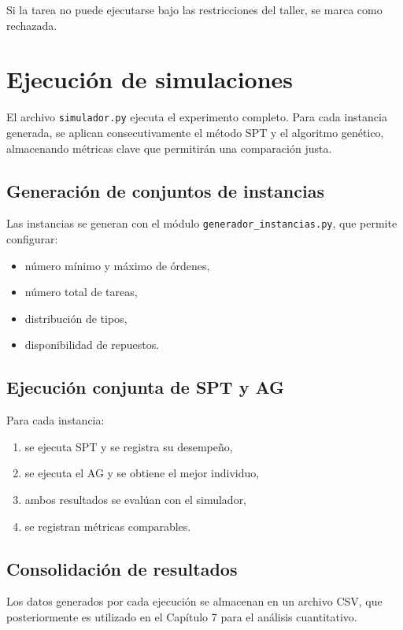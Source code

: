 Si la tarea no puede ejecutarse bajo las restricciones del taller, se marca como rechazada.

\section{Ejecución de simulaciones}

El archivo \texttt{simulador.py} ejecuta el experimento completo. Para cada instancia generada, se aplican consecutivamente el método SPT y el algoritmo genético, almacenando métricas clave que permitirán una comparación justa.

\subsection{Generación de conjuntos de instancias}

Las instancias se generan con el módulo \texttt{generador\_instancias.py}, que permite configurar:

\begin{itemize}
    \item número mínimo y máximo de órdenes,
    \item número total de tareas,
    \item distribución de tipos,
    \item disponibilidad de repuestos.
\end{itemize}

\subsection{Ejecución conjunta de SPT y AG}

Para cada instancia:

\begin{enumerate}
    \item se ejecuta SPT y se registra su desempeño,
    \item se ejecuta el AG y se obtiene el mejor individuo,
    \item ambos resultados se evalúan con el simulador,
    \item se registran métricas comparables.
\end{enumerate}

\subsection{Consolidación de resultados}

Los datos generados por cada ejecución se almacenan en un archivo CSV, que posteriormente es utilizado en el Capítulo 7 para el análisis cuantitativo.

